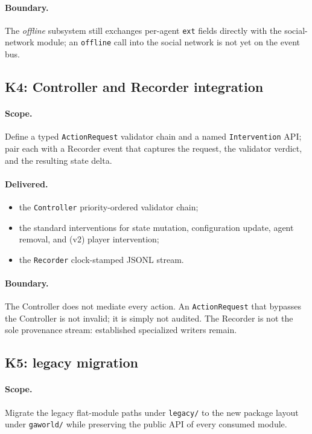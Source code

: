 \paragraph{Boundary.}
The \emph{offline} subsystem still exchanges per-agent \texttt{ext} fields
directly with the social-network module; an \texttt{offline} call into the
social network is not yet on the event bus.

\subsection{K4: Controller and Recorder integration}

\paragraph{Scope.}  Define a typed \texttt{ActionRequest} validator chain
and a named \texttt{Intervention} API; pair each with a Recorder event
that captures the request, the validator verdict, and the resulting
state delta.

\paragraph{Delivered.}
\begin{itemize}[leftmargin=*]
  \item the \texttt{Controller} priority-ordered validator chain;
  \item the standard interventions for state mutation, configuration
  update, agent removal, and (v2) player intervention;
  \item the \texttt{Recorder} clock-stamped JSONL stream.
\end{itemize}

\paragraph{Boundary.}
The Controller does not mediate every action.  An \texttt{ActionRequest}
that bypasses the Controller is not invalid; it is simply not audited.
The Recorder is not the sole provenance stream: established
specialized writers remain.

\subsection{K5: legacy migration}

\paragraph{Scope.}  Migrate the legacy flat-module paths under \texttt{legacy/}
to the new package layout under \texttt{gaworld/} while preserving the
public API of every consumed module.

